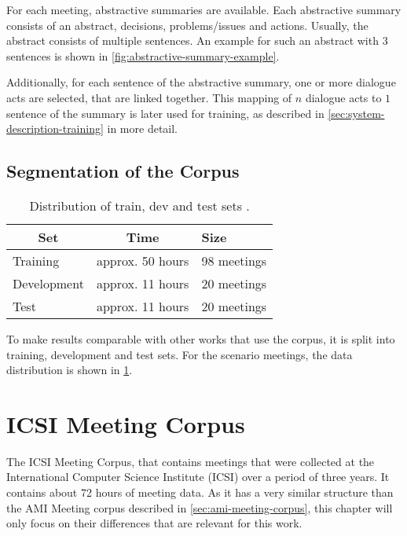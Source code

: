 For each meeting, abstractive summaries are available.
Each abstractive summary consists of an abstract, decisions, problems/issues and actions.
Usually, the abstract consists of multiple sentences.
An example for such an abstract with 3 sentences is shown in \cref{fig:abstractive-summary-example}.

Additionally, for each sentence of the abstractive summary, one or more dialogue acts are selected, that are linked together.
This mapping of $n$ dialogue acts to $1$ sentence of the summary is later used for training, as described in \cref{sec:system-description-training} in more detail. \cite{amiWebsite}

\subsection{Segmentation of the Corpus}\label{ssec:ami-segmentation-of-the-corpus}

\begin{table}[h]
\centering
\begin{tabular}{@{}lll@{}}
\toprule
\multicolumn{1}{c}{\textbf{Set}} & \multicolumn{1}{c}{\textbf{Time}} & \textbf{Size} \\ \midrule
Training                         & approx. 50 hours                  & 98 meetings   \\
Development                      & approx. 11 hours                  & 20 meetings   \\
Test                             & approx. 11 hours                  & 20 meetings   \\ \bottomrule
\end{tabular}
\caption[Distribution of train, dev and test sets]{Distribution of train, dev and test sets \cite{amiWebsite}.}
\label{tab:meeting-time-distribution}
\end{table}

To make results comparable with other works that use the corpus, it is split into training, development and test sets.
For the scenario meetings, the data distribution is shown in \cref{tab:meeting-time-distribution}. \cite{amiWebsite}


\section{ICSI Meeting Corpus}

The ICSI Meeting Corpus, that contains meetings that were collected at the International Computer Science Institute (ICSI) over a period of three years.
It contains about 72 hours of meeting data. \cite{Janin}
As it has a very similar structure than the AMI Meeting corpus described in \cref{sec:ami-meeting-corpus}, this chapter will only focus on their differences that are relevant for this work.

